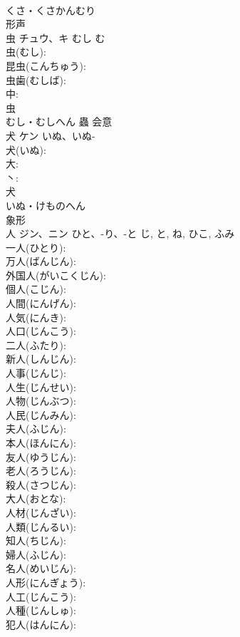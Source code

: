 \documentclass[8pt]{extreport}
\begin{document}
\begin{CJK}{UTF8}{min}
\\	くさ・くさかんむり	
\\	形声 
\\	虫	チュウ、キ	むし	む	
\\	虫(むし): 
\\	昆虫(こんちゅう): 
\\	虫歯(むしば): 
\\	中: 
\\	虫	
\\	むし・むしへん	蟲	会意 
\\	犬	ケン	いぬ、いぬ-		
\\	犬(いぬ): 
\\	大: 
\\	丶: 
\\	犬	
\\	いぬ・けものへん	
\\	象形 
\\	人	ジン、ニン	ひと、-り、-と	じ, と, ね, ひこ, ふみ	
\\	一人(ひとり): 
\\	万人(ばんじん): 
\\	外国人(がいこくじん): 
\\	個人(こじん): 
\\	人間(にんげん): 
\\	人気(にんき): 
\\	人口(じんこう): 
\\	二人(ふたり): 
\\	新人(しんじん): 
\\	人事(じんじ): 
\\	人生(じんせい): 
\\	人物(じんぶつ): 
\\	人民(じんみん): 
\\	夫人(ふじん): 
\\	本人(ほんにん): 
\\	友人(ゆうじん): 
\\	老人(ろうじん): 
\\	殺人(さつじん): 
\\	大人(おとな): 
\\	人材(じんざい): 
\\	人類(じんるい): 
\\	知人(ちじん): 
\\	婦人(ふじん): 
\\	名人(めいじん): 
\\	人形(にんぎょう): 
\\	人工(じんこう): 
\\	人種(じんしゅ): 
\\	犯人(はんにん): 

\end{CJK}
\end{document}
